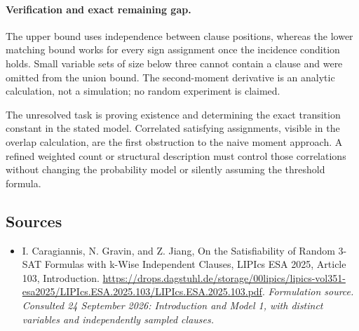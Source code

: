 \documentclass[11pt]{article}
\begin{document}
\paragraph{Verification and exact remaining gap.}
The upper bound uses independence between clause positions, whereas the lower matching bound works for every sign assignment once the incidence condition holds. Small variable sets of size below three cannot contain a clause and were omitted from the union bound. The second-moment derivative is an analytic calculation, not a simulation; no random experiment is claimed.

The unresolved task is proving existence and determining the exact transition constant in the stated model. Correlated satisfying assignments, visible in the overlap calculation, are the first obstruction to the naive moment approach. A refined weighted count or structural description must control those correlations without changing the probability model or silently assuming the threshold formula.

\subsection{Sources}
\begin{itemize}
\item[S1]I. Caragiannis, N. Gravin, and Z. Jiang, On the Satisfiability of Random 3-SAT Formulas with k-Wise Independent Clauses, LIPIcs ESA 2025, Article 103, Introduction.
\url{https://drops.dagstuhl.de/storage/00lipics/lipics-vol351-esa2025/LIPIcs.ESA.2025.103/LIPIcs.ESA.2025.103.pdf}.
\textit{Formulation source. Consulted 24 September 2026: Introduction and Model 1, with distinct variables and independently sampled clauses.}
\end{itemize}
\end{document}
